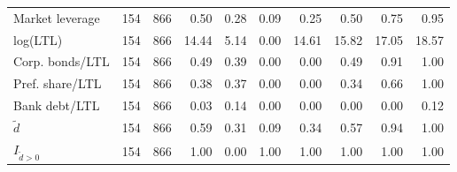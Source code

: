 \begin{threeparttable}
\begin{tabular}{lrrrrrrrrr}
Market leverage & 154 & 866 & 0.50 & 0.28 & 0.09 & 0.25 & 0.50 & 0.75 & 0.95 \\
log(LTL) & 154 & 866 & 14.44 & 5.14 & 0.00 & 14.61 & 15.82 & 17.05 & 18.57 \\
Corp. bonds/LTL & 154 & 866 & 0.49 & 0.39 & 0.00 & 0.00 & 0.49 & 0.91 & 1.00 \\
Pref. share/LTL & 154 & 866 & 0.38 & 0.37 & 0.00 & 0.00 & 0.34 & 0.66 & 1.00 \\
Bank debt/LTL & 154 & 866 & 0.03 & 0.14 & 0.00 & 0.00 & 0.00 & 0.00 & 0.12 \\
\ensuremath{\tilde{d}} & 154 & 866 & 0.59 & 0.31 & 0.09 & 0.34 & 0.57 & 0.94 & 1.00 \\
\ensuremath{I_{\tilde{d}>0}} & 154 & 866 & 1.00 & 0.00 & 1.00 & 1.00 & 1.00 & 1.00 & 1.00 \\
\bottomrule\end{tabular}\end{threeparttable}
